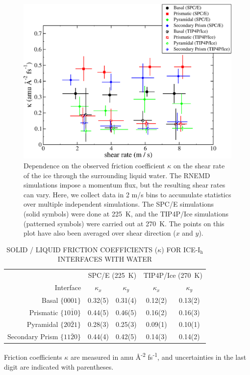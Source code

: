 \begin{figure}
\includegraphics[width=\linewidth]{Figures/kappaPlot2}
\caption{\label{fig:kappaPlot} Dependence on the observed friction
  coefficient $\kappa$ on the shear rate of the ice through the surrounding
  liquid water.  The RNEMD simulations impose a momentum flux, but the
  resulting shear rates can vary.  Here, we collect data in 2 m/s bins
  to accumulate statistics over multiple independent simulations.  The
  SPC/E simulations (solid symbols) were done at 225~K, and the
  TIP4P/Ice simulations (patterned symbols) were carried out at
  270~K. The points on this plot have also been averaged over shear
  direction ($x$ and $y$).}
\end{figure}


\begin{table}[h]
\centering
\caption{SOLID / LIQUID FRICTION COEFFICIENTS ($\kappa$) FOR
  ICE-I$_\mathrm{h}$ INTERFACES WITH WATER \label{tab:kappa}}
\begin{tabular}{r|cc|cc}  
  \hline
\hline
  & \multicolumn{2}{c|}{SPC/E (225~K)} & \multicolumn{2}{c}{TIP4P/Ice (270~K)} \\
  Interface & $\kappa_{x}$ &  $\kappa_{y}$ & $\kappa_{x}$ &  $\kappa_{y}$ \\ 
  \hline
  Basal  $\{0001\}$                 & 0.32(5)  & 0.31(4) & 0.12(2)  & 0.13(2) \\
  Prismatic  $\{10\bar{1}0\}$       & 0.44(5)  & 0.46(5) & 0.16(2)  & 0.16(3) \\
  Pyramidal  $\{20\bar{2}1\}$       & 0.28(3)  & 0.25(3) & 0.09(1)  & 0.10(1) \\
  Secondary Prism  $\{11\bar{2}0\}$ & 0.44(4)  & 0.42(5) & 0.14(3)  & 0.14(2) \\ 
  \hline
\hline
\end{tabular}
\begin{flushleft}
  Friction coefficients $\kappa$ are measured in amu
  \AA\textsuperscript{-2} fs\textsuperscript{-1}, and uncertainties in
  the last digit are indicated with parentheses.
\end{flushleft}
\end{table}

